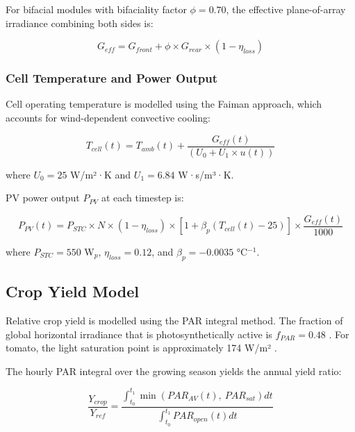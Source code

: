 \documentclass[12pt, a4paper]{article}
\begin{document}
For bifacial modules with bifaciality factor $\phi = 0.70$, the effective plane-of-array irradiance combining both sides is:

\begin{equation}
G_{eff} = G_{front} + \phi \times G_{rear} \times (1 - \eta_{loss})
\label{eq:geff}
\end{equation}

\subsubsection{Cell Temperature and Power Output}

\hspace{1cm}Cell operating temperature is modelled using the Faiman \cite{faiman2008} approach, which accounts for wind-dependent convective cooling:

\begin{equation}
T_{cell}(t) = T_{amb}(t) + \frac{G_{eff}(t)}{(U_0 + U_1 \times u(t))}
\label{eq:celltemp}
\end{equation}

where $U_0 = 25$ W/m²·K and $U_1 = 6.84$ W·s/m³·K.

PV power output $P_{PV}$ at each timestep is:

\begin{equation}
P_{PV}(t) = P_{STC} \times N \times (1 - \eta_{loss}) \times \left[1 + \beta_p(T_{cell}(t) - 25)\right] \times \frac{G_{eff}(t)}{1000}
\label{eq:pvpower}
\end{equation}

where $P_{STC} = 550$ W$_p$, $\eta_{loss} = 0.12$, and $\beta_p = -0.0035$ °C$^{-1}$.

\subsection{Crop Yield Model}

\hspace{1cm}Relative crop yield is modelled using the PAR integral method. The fraction of global horizontal irradiance that is photosynthetically active is $f_{PAR} = 0.48$ \cite{mccree1971, jacovides2006}. For tomato, the light saturation point is approximately 174 W/m² \cite{mohammedi2023, heuvelink2005}.

The hourly PAR integral over the growing season yields the annual yield ratio:

\begin{equation}
\frac{Y_{crop}}{Y_{ref}} = \frac{\int_{t_0}^{t_1} \min\left(PAR_{AV}(t),\ PAR_{sat}\right) dt}{\int_{t_0}^{t_1} PAR_{open}(t) dt}
\label{eq:cropyield}
\end{equation}
\end{document}
